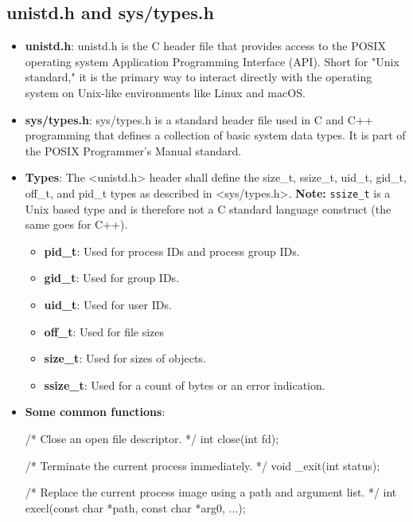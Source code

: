 \documentclass{report}
\begin{document}
        \subsection{unistd.h and sys/types.h}
        \begin{itemize}
            \item \textbf{unistd.h}: unistd.h is the C header file that provides access to the POSIX operating system Application Programming Interface (API). Short for "Unix standard," it is the primary way to interact directly with the operating system on Unix-like environments like Linux and macOS.
            \item \textbf{sys/types.h}: sys/types.h is a standard header file used in C and C++ programming that defines a collection of basic system data types. It is part of the POSIX Programmer's Manual standard.
            \item \textbf{Types}: The <unistd.h> header shall define the size\_t, ssize\_t, uid\_t, gid\_t, off\_t, and pid\_t types as described in <sys/types.h>.
                \bigbreak \noindent 
                \textbf{Note:} \texttt{ssize\_t} is a Unix based type and is therefore not a C standard language construct (the same goes for C++).
                \begin{itemize}
                    \item \textbf{pid\_t}: Used for process IDs and process group IDs.
                    \item \textbf{gid\_t}: Used for group IDs.
                    \item \textbf{uid\_t}: Used for user IDs.
                    \item \textbf{off\_t}: Used for file sizes
                    \item \textbf{size\_t}: Used for sizes of objects.
                    \item \textbf{ssize\_t}: Used for a count of bytes or an error indication.
                \end{itemize}
            \item \textbf{Some common functions}: 
                \bigbreak \noindent 
                \begin{cppcode}
                    /* Close an open file descriptor. */
                    int close(int fd);

                    /* Terminate the current process immediately. */
                    void _exit(int status);

                    /* Replace the current process image using a path and argument list. */
                    int execl(const char *path, const char *arg0, ...);


\end{cppcode}
\end{itemize}
\end{document}
